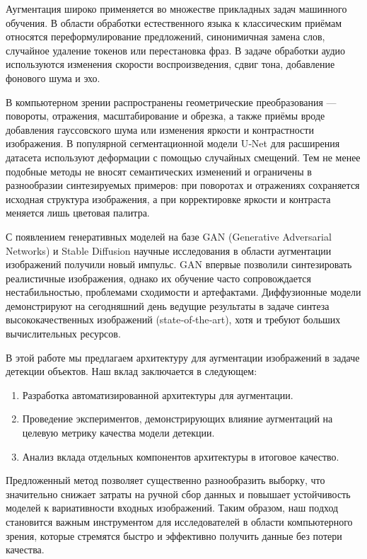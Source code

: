 Аугментация широко применяется во множестве прикладных задач машинного обучения. В области обработки естественного языка к классическим приёмам относятся переформулирование предложений, синонимичная замена слов, случайное удаление токенов или перестановка фраз. В задаче обработки аудио используются изменения скорости воспроизведения, сдвиг тона, добавление фонового шума и эхо. 

В компьютерном зрении распространены геометрические преобразования — повороты, отражения, масштабирование и обрезка, а также приёмы вроде добавления гауссовского шума или изменения яркости и контрастности изображения. В популярной сегментационной модели U‑Net для расширения датасета используют деформации с помощью случайных смещений. Тем не менее подобные методы не вносят семантических изменений и ограничены в разнообразии синтезируемых примеров: при поворотах и отражениях сохраняется исходная структура изображения, а при корректировке яркости и контраста меняется лишь цветовая палитра.

С появлением генеративных моделей на базе GAN (Generative Adversarial Networks) и Stable Diffusion научные исследования в области аугментации изображений получили новый импульс. GAN впервые позволили синтезировать реалистичные изображения, однако их обучение часто сопровождается нестабильностью, проблемами сходимости и артефактами. Диффузионные модели демонстрируют на сегодняшний день ведущие результаты в задаче синтеза высококачественных изображений (state‑of‑the‑art), хотя и требуют больших вычислительных ресурсов.

В этой работе мы предлагаем архитектуру для аугментации изображений в задаче детекции объектов.
Наш вклад заключается в следующем:

\begin{enumerate}
    \item Разработка автоматизированной архитектуры для аугментации.
    \item Проведение экспериментов, демонстрирующих влияние аугментаций на целевую метрику качества модели детекции.
    \item Анализ вклада отдельных компонентов архитектуры в итоговое качество.
\end{enumerate}

Предложенный метод позволяет существенно разнообразить выборку, что значительно снижает затраты на ручной сбор данных и повышает устойчивость моделей к вариативности входных изображений. Таким образом, наш подход становится важным инструментом для исследователей в области компьютерного зрения, которые стремятся быстро и эффективно получить данные без потери качества.